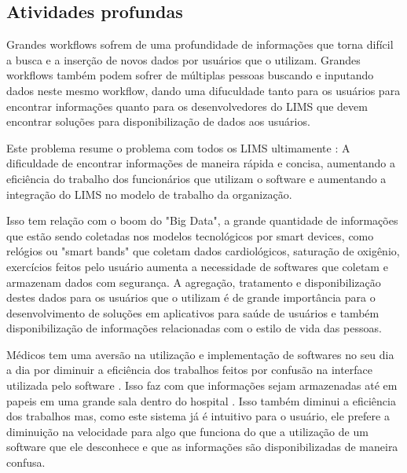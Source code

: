 \subsection{Atividades profundas}


Grandes workflows sofrem de uma profundidade de informações que torna difícil \NO a busca e a inserção de novos dados por usuários que o utilizam. Grandes workflows também podem sofrer de múltiplas pessoas buscando e inputando dados neste mesmo workflow, dando uma difuculdade tanto para os usuários para encontrar informações quanto para os desenvolvedores do LIMS que devem encontrar soluções para disponibilização de dados aos usuários.


Este problema resume o problema com todos os LIMS ultimamente \R: A dificuldade de encontrar informações de maneira rápida e concisa, aumentando a eficiência do trabalho dos funcionários que utilizam o software e aumentando a integração do LIMS no modelo de trabalho da organização.


Isso tem relação com o boom do "Big Data", a grande quantidade de informações que estão sendo coletadas nos modelos tecnológicos por smart devices, como relógios ou "smart bands" que coletam dados cardiológicos, saturação de oxigênio, exercícios feitos pelo usuário aumenta a necessidade de softwares que coletam e armazenam dados com segurança. A agregação, tratamento e disponibilização destes dados para os usuários que o utilizam é de grande importância para o desenvolvimento de soluções em aplicativos para saúde de usuários e também disponibilização de informações relacionadas com o estilo de vida das pessoas.


Médicos tem uma aversão na utilização e implementação de softwares no seu dia a dia por diminuir a eficiência dos trabalhos feitos por confusão na interface utilizada pelo software \R. Isso faz com que informações sejam armazenadas até em papeis em uma grande sala dentro do hospital \R. Isso também diminui a eficiência dos trabalhos mas, como este sistema já é intuitivo para o usuário, ele prefere a diminuição na velocidade para algo que funciona do que a utilização de um software que ele desconhece e que as informações são disponibilizadas de maneira confusa.

